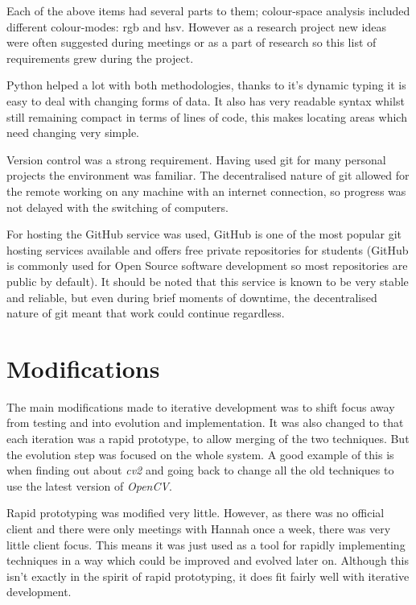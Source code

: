 Each of the above items had several parts to them; colour-space analysis included different 
colour-modes: \gls{rgb} and \gls{hsv}. However as a research project new ideas were often 
suggested during meetings or as a part of research so this list of requirements grew during the
project.

Python helped a lot with both methodologies, thanks to it's dynamic typing it is easy to deal with
changing forms of data. It also has very readable syntax whilst still remaining compact in terms
of lines of code, this makes locating areas which need changing very simple.

Version control was a strong requirement. Having used git for many personal projects the 
environment was familiar. The decentralised nature of git allowed for the remote working on any
machine with an internet connection, so progress was not delayed with the switching of computers.

For hosting the GitHub service was used, GitHub is one of the most popular git hosting services
available and offers free private repositories for students (GitHub is commonly used for Open 
Source software development so most repositories are public by default). It should be noted that
this service is known to be very stable and reliable, but even during brief moments of downtime,
the decentralised nature of git meant that work could continue regardless.

\section{Modifications}

The main modifications made to iterative development was to shift focus away from testing and into
evolution and implementation. It was also changed to that each iteration was a rapid prototype,
to allow merging of the two techniques. But the evolution step was focused on the whole system.
A good example of this is when finding out about \emph{cv2} and going back to change all the old
techniques to use the latest version of \emph{OpenCV}.

Rapid prototyping was modified very little. However, as there was no official client and there were only meetings with
Hannah once a week, there was very little client focus. This means it was just used as a tool for rapidly
implementing techniques in a way which could be improved and evolved later on. Although this isn't
exactly in the spirit of rapid prototyping, it does fit fairly well with iterative development.


